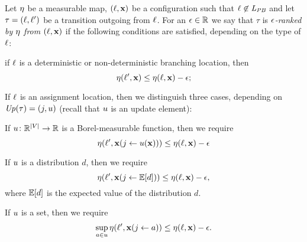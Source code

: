 \begin{definition}
\label{def:rank1}
Let $\eta$ be a measurable map, $(\ell,\mathbf{x})$ be a configuration such that 
$\ell\not\in \mathit{L}_{\mathit{PB}}$ and let 
$\tau=(\ell,\ell')$ be a 
transition outgoing from $\ell$. For an $\epsilon\in \mathbb{R}$ we say that $\tau$ is 
\emph{$\epsilon$-ranked by $\eta$ from $(\ell,\mathbf{x})$} if the following 
conditions are 
satisfied, depending on the type of $\ell$:
\begin{compactitem} %
		\item 
		if $\ell$ is a deterministic or non-deterministic branching location, 
		then
		$$\eta(\ell',\mathbf{x}) \leq 
		\eta(\ell,\mathbf{x})-\epsilon;$$
		
		
		\item 
		If $\ell$ is an assignment location, then we distinguish 
		three cases, depending on $\mathit{Up}(\tau)=(j,u)$ (recall that $u$ 
is an update element):
		\begin{compactitem}
			\item If $u\colon \mathbb{R}^{|V|}\rightarrow \mathbb{R}$ is a 
Borel-measurable function, then we require
			$$\eta(\ell',\mathbf{x}(j\leftarrow 
u(\mathbf{x}))) \leq \eta(\ell,\mathbf{x})-\epsilon$$
			\item If $u$ is a distribution $d$, then we require $$ 
			\eta(\ell',\mathbf{x}(j\leftarrow \mathbb{E}[d])) \leq 
			\eta(\ell,\mathbf{x})-\epsilon,$$ 
			where $\mathbb{E}[d]$ is the 
expected value of the 
			distribution $d$.
			\item 
			If $u$ is a set, then we require $$\sup_{a\in u}
			\eta(\ell',\mathbf{x}(j \leftarrow a)) \leq \eta(\ell,\mathbf{x})-\epsilon.$$
		\end{compactitem}
		
	\end{compactitem}
\end{definition}

